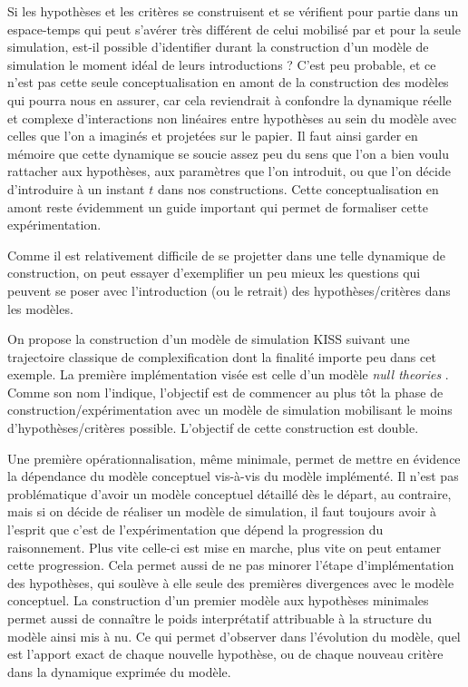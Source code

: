 Si les hypothèses et les critères se construisent et se vérifient pour partie dans un espace-temps qui peut s'avérer très différent de celui mobilisé par et pour la seule simulation, est-il possible d'identifier durant la construction d'un modèle de simulation le moment idéal de leurs introductions ? C'est peu probable, et ce n'est pas cette seule conceptualisation en amont de la construction des modèles qui pourra nous en assurer, car cela reviendrait à confondre la dynamique réelle et complexe d'interactions non linéaires entre hypothèses au sein du modèle avec celles que l'on a imaginés et projetées sur le papier. Il faut ainsi garder en mémoire que cette dynamique se soucie assez peu du sens que l'on a bien voulu rattacher aux hypothèses, aux paramètres que l'on introduit, ou que l'on décide d'introduire à un instant $t$ dans nos constructions. Cette conceptualisation en amont reste évidemment un guide important qui permet de formaliser cette expérimentation.

Comme il est relativement difficile de se projetter dans une telle dynamique de construction, on peut essayer d'exemplifier un peu mieux les questions qui peuvent se poser avec l'introduction (ou le retrait) des hypothèses/critères dans les modèles.

On propose la construction d'un modèle de simulation KISS suivant une trajectoire classique de complexification dont la finalité importe peu dans cet exemple. La première implémentation visée est celle d'un modèle \textit{null theories} \textcite{Railsback2012}. Comme son nom l'indique, l'objectif est de commencer au plus tôt la phase de construction/expérimentation avec un modèle de simulation mobilisant le moins d'hypothèses/critères possible. L'objectif de cette construction est double.

Une première opérationnalisation, même minimale, permet de mettre en évidence la dépendance du modèle conceptuel vis-à-vis du modèle implémenté. Il n'est pas problématique d'avoir un modèle conceptuel détaillé dès le départ, au contraire, mais si on décide de réaliser un modèle de simulation, il faut toujours avoir à l'esprit que c'est de l'expérimentation que dépend la progression du raisonnement. Plus vite celle-ci est mise en marche, plus vite on peut entamer cette progression. Cela permet aussi de ne pas minorer l'étape d'implémentation des hypothèses, qui soulève à elle seule des premières divergences avec le modèle conceptuel. La construction d'un premier modèle aux hypothèses minimales permet aussi de connaître le poids interprétatif attribuable à la structure du modèle ainsi mis à nu. Ce qui permet d’observer dans l’évolution du modèle, quel est l’apport exact de chaque nouvelle hypothèse, ou de chaque nouveau critère dans la dynamique exprimée du modèle.

